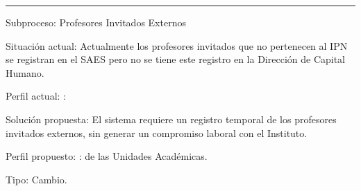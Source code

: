 \hrule
\vspace{0.2cm}
\begin{Cdescription}
	\item[Subproceso:] Profesores Invitados Externos
	\item[Situación actual:] Actualmente los profesores invitados que no pertenecen al IPN se registran en el SAES pero no se tiene este registro en la Dirección de Capital Humano.  
	\item[Perfil actual:] :
	\item[Solución propuesta:] 
	El sistema requiere un registro temporal de los profesores invitados externos, sin generar un compromiso laboral con el Instituto. 
	
	\item[Perfil propuesto:] :  de las Unidades Académicas.
	\item[Tipo:] Cambio.
\end{Cdescription}







